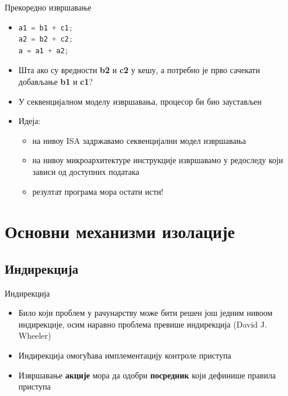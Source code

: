 \documentclass[xcolor=table]{beamer}
\begin{document}
    \begin{frame}[fragile]{Прекоредно извршавање}
        \begin{itemize}
            \item{
                \begin{lstlisting}[language=java]
a1 = b1 + c1;
a2 = b2 + c2;
a = a1 + a2;
                \end{lstlisting}
            }
            
            \item Шта ако су вредности \textbf{b2} и \textbf{c2} у кешу, а потребно је прво сачекати добављање \textbf{b1} и \textbf{c1}?
            \item У секвенцијалном моделу извршавања, процесор би био заустављен
            \item Идеја:
            \begin{itemize}
                \item на нивоу ISA задржавамо секвенцијални модел извршавања
                \item на нивоу микроархитектуре инструкције извршавамо у редоследу који зависи од доступних података
                \item резултат програма мора остати исти!
            \end{itemize}
        \end{itemize}
    \end{frame}
    
    \section{Основни механизми изолације}
    \subsection{Индирекција}
    
    \begin{frame}{Индирекција}
        \begin{itemize}
            \item Било који проблем у рачунарству може бити решен још једним нивоом индирекције, осим наравно проблема превише индирекција (David J. Wheeler)
            \item Индирекција омогућава имплементацију контроле приступа
            \item Извршавање \textbf{акције} мора да одобри \textbf{посредник} који дефинише правила приступа
        \end{itemize}
    \end{frame}
    
\end{document}

